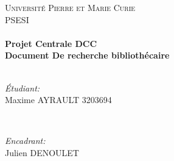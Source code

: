 \begin{titlepage}

\center %
 

\textsc{\LARGE Universit\'e Pierre et Marie Curie}\\[1.5cm] %
\textsc{\Large PSESI}\\[0.5cm] %


\HRule \\[0.4cm]
{ \huge \bfseries Projet Centrale DCC}\\[0.4cm] %
{ \huge \bfseries Document De recherche bibliothécaire}\\[0.4cm] %
\HRule \\[1.5cm]
 

\begin{minipage}{0.4\textwidth}
\begin{flushleft} \large
\emph{\'Etudiant:}\\
Maxime \textsc{AYRAULT} 3203694 %
\end{flushleft}
\end{minipage}
~
\begin{minipage}{0.4\textwidth}
\begin{flushright} \large
\emph{Encadrant:} \\
Julien \textsc{DENOULET} %
\end{flushright}
\end{minipage}\\[2cm]



\end{titlepage}
